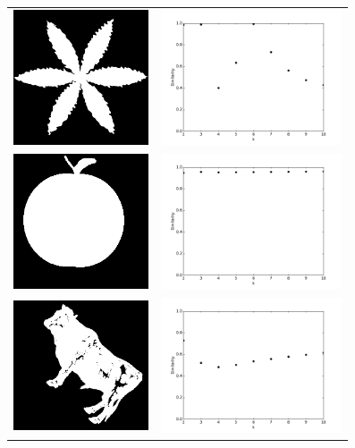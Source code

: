 \documentclass[a4paper, 11pt]{article}
\begin{document}
\begin{figure}[p]
\centering
\begin{tabular}{ll}
\includegraphics[width=4cm]{device1.png} &
\includegraphics[height=4cm]{device1-rotation.pdf} \\
\includegraphics[width=4cm]{apple.png} &
\includegraphics[height=4cm]{apple-rotation.pdf} \\
\includegraphics[width=4cm]{cattle.png} &
\includegraphics[height=4cm]{cattle-rotation.pdf} \\

\end{tabular}
\end{figure}
\end{document}
